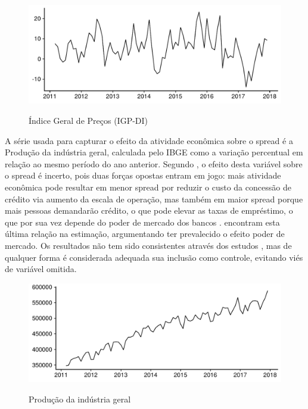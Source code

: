 \documentclass[a4paper,
               article,
               12pt,
               openany,
               oneside,
               english,
               brazil]{abntex2}
\numberwithin{equation}{section}
\begin{document}
\begin{figure}[h]
  \centering
    \caption{Índice Geral de Preços (IGP-DI)}
      \includegraphics[width = \textwidth, scale=0.75]{IGP.pdf}
      \label{igp}
\end{figure}
    
    A série usada para capturar o efeito da atividade econômica sobre o spread é a Produção da indústria geral, calculada pelo IBGE como a variação percentual em relação ao mesmo período do ano anterior. Segundo , o efeito desta variável sobre o spread é incerto, pois duas forças opostas entram em jogo: mais atividade econômica pode resultar em menor spread por reduzir o custo da concessão de crédito via aumento da escala de operação, mas também em maior spread porque mais pessoas demandarão crédito, o que pode elevar as taxas de empréstimo, o que por sua vez depende do poder de mercado dos bancos .  encontram esta última relação na estimação, argumentando ter prevalecido o efeito poder de mercado. Os resultados não tem sido consistentes através dos estudos \cite[p.~236]{leal07}, mas de qualquer forma é considerada adequada sua inclusão como controle, evitando viés de variável omitida.


    \begin{figure}[h]
        \centering
        \caption{Produção da indústria geral}
        \includegraphics[width = \textwidth, scale=0.75]{PIB_Mensal.pdf}
        \label{prodind}
    \end{figure}
\end{document}
